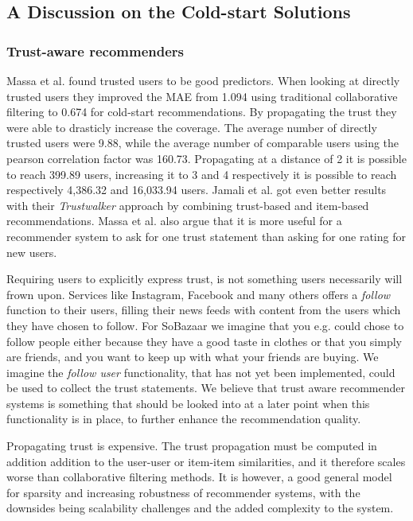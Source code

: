\subsection{A Discussion on the Cold-start Solutions}

\subsubsection{Trust-aware recommenders}

Massa et al. \cite{Massa2007} found trusted users to be good predictors. When
looking at directly trusted users they improved the MAE from 1.094 using
traditional collaborative filtering to 0.674 for cold-start recommendations. By
propagating the trust they were able to drasticly increase the coverage. The
average number of directly trusted users were 9.88, while the average number of
comparable users using the pearson correlation factor was 160.73. Propagating
at a distance of 2 it is possible to reach 399.89 users, increasing it to 3 and
4 respectively it is possible to reach respectively 4,386.32 and 16,033.94
users. Jamali et al. \cite{Jamali2009} got even better results with their
\emph{Trustwalker} approach by combining trust-based and item-based
recommendations. Massa et al. \cite{Massa2004} also argue that it is more
useful for a recommender system to ask for one trust statement than asking for
one rating for new users.

Requiring users to explicitly express trust, is not something users necessarily
will frown upon. Services like Instagram, Facebook and many others offers a
\emph{follow} function to their users, filling their news feeds with content from
the users which they have chosen to follow. For SoBazaar we imagine that you
e.g. could chose to follow people either because they have a good taste in
clothes or that you simply are friends, and you want to keep up with what your
friends are buying. We imagine the \emph{follow user} functionality, that has
not yet been implemented, could be used to collect the trust statements. We
believe that trust aware recommender systems is something that should be looked
into at a later point when this functionality is in place, to further enhance
the recommendation quality.

Propagating trust is expensive. The trust propagation must be computed in
addition addition to the user-user or item-item similarities, and it therefore
scales worse than collaborative filtering methods. It is however, a good general model for
sparsity and increasing robustness of recommender systems, with the downsides
being scalability challenges and the added complexity to the system.

